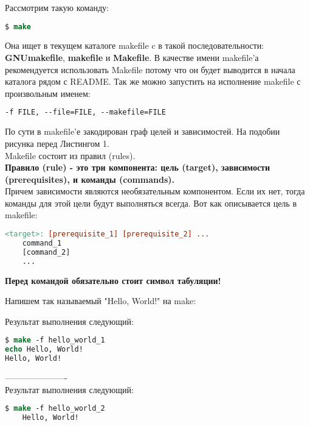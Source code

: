 Рассмотрим такую команду: \\

\begin{lstlisting}[language=csh]
$ make
\end{lstlisting}

Она ищет в текущем каталоге makefile c в такой последовательности: \textbf{GNUmakefile}, \textbf{makefile} и \textbf{Makefile}. В качестве имени makefile'а рекомендуется использовать Makefile потому что он будет выводится в начала каталога рядом с README. Так же можно запустить на исполнение makefile с произвольным именем:

\begin{lstlisting}[language=csh]
-f FILE, --file=FILE, --makefile=FILE
\end{lstlisting}

По сути в makefile'е закодирован граф целей и зависимостей. На подобии рисунка перед Листингом 1. \\
Makefile состоит из правил (rules). \\
\textbf{Правило (rule) - это три компонента: цель (target), зависимости (prerequisites), и команды (commands).}\\
Причем зависимости являются необязательным компонентом. Если их нет, тогда команды для этой цели будут выполняться всегда. Вот как описывается цель в makefile:

\begin{lstlisting}[language=make]
<target>: [prerequisite_1] [prerequisite_2] ...
	command_1
	[command_2]
	...
\end{lstlisting}

\textbf{Перед командой обязательно стоит символ табуляции!}

Напишем так называемый "Hello, World!" на make:


Результат выполнения следующий:

\begin{lstlisting}[language=csh]
$ make -f hello_world_1
echo Hello, World!
Hello, World!
\end{lstlisting}

---------------------- \\



Результат выполнения следующий:

\begin{lstlisting}[language=csh]
	$ make -f hello_world_2
	Hello, World!
\end{lstlisting}

